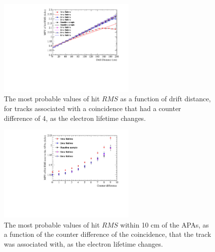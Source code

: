 \begin{figure}
  \centering
  \includegraphics[width=0.6\textwidth]{Canvas_CountDiff4_All_Positions_ElecLifetime}
  \caption[The drift distance dependence of diffusion in the 35 ton dataset and Monte Carlo for coincidences with a counter difference of 4, as the electron lifetime changes]
          {The most probable values of hit $RMS$ as a function of drift distance, for tracks associated with a coincidence that had a counter difference of 4, as the electron lifetime changes.}
  \label{fig:DiffLifeStudy_CDiff4}
\end{figure}

\begin{figure}
  \centering
  \includegraphics[width=0.6\textwidth]{Canvas_All_Angles_RMS0cm_ElecLifetime}
  \caption[The angular dependence of diffusion in the 35 ton dataset and Monte Carlo for hits within 10 cm of the APAs, as the electron lifetime changes]
          {The most probable values of hit $RMS$ within 10 cm of the APAs, as a function of the counter difference of the coincidence, that the track was associated with, as the electron lifetime changes.}
  \label{fig:DiffLifeStudy_RMS0cm}
\end{figure}

